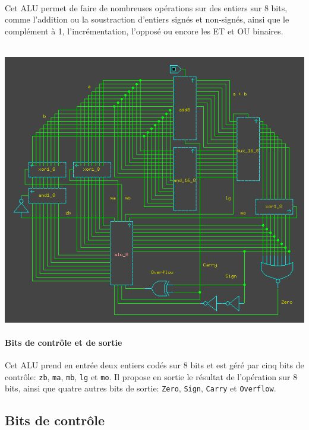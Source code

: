 \documentclass[11pt, a4paper, twoside, titlepage]{article}
\begin{document}
\paragraph{}
Cet ALU permet de faire de nombreuses opérations sur des entiers sur 8 bits, comme l'addition ou la soustraction d'entiers signés et non-signés, ainsi que le complément à 1, l'incrémentation, l'opposé ou encore les ET et OU binaires.\\
\\
\centerline{\includegraphics[width=.8\textwidth]{alu_8}}

\paragraph{Bits de contrôle et de sortie}
Cet ALU prend en entrée deux entiers codés sur 8 bits et est géré par cinq bits de contrôle: \texttt{zb}, \texttt{ma}, \texttt{mb}, \texttt{lg} et \texttt{mo}. Il propose en sortie le résultat de l'opération sur 8 bits, ainsi que quatre autres bits de sortie: \texttt{Zero}, \texttt{Sign}, \texttt{Carry} et \texttt{Overflow}.

\subsection{Bits de contrôle}
\end{document}
